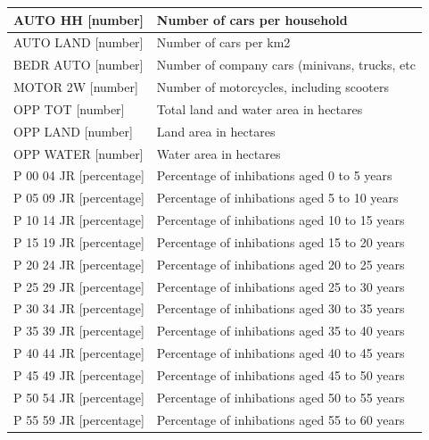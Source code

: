 \documentclass[a4paper,twoside,11pt]{article}
\begin{document}
\begin{center}
\begin{tabular}{ | p{4.9cm} | p{10cm} |}
        AUTO HH [number] & Number of cars per household \\ \hline
        AUTO LAND [number] & Number of cars per km2 \\ \hline
        BEDR AUTO [number] & Number of company cars (minivans, trucks, etc \\ \hline
        MOTOR 2W [number] & Number of motorcycles, including scooters \\ \hline
        OPP TOT [number] & Total land and water area in hectares \\ \hline
        OPP LAND [number] & Land area in hectares \\ \hline
        OPP WATER [number] & Water area in hectares \\ \hline
        P 00 04 JR [percentage] & Percentage of inhibations aged 0 to 5 years \\ \hline
        P 05 09 JR [percentage] & Percentage of inhibations aged 5 to 10 years \\ \hline
        P 10 14 JR [percentage] & Percentage of inhibations aged 10 to 15 years \\ \hline
        P 15 19 JR [percentage] & Percentage of inhibations aged 15 to 20 years \\ \hline
        P 20 24 JR [percentage] & Percentage of inhibations aged 20 to 25 years \\ \hline
        P 25 29 JR [percentage] & Percentage of inhibations aged 25 to 30 years \\ \hline
        P 30 34 JR [percentage] & Percentage of inhibations aged 30 to 35 years \\ \hline
        P 35 39 JR [percentage] & Percentage of inhibations aged 35 to 40 years \\ \hline
        P 40 44 JR [percentage] & Percentage of inhibations aged 40 to 45 years \\ \hline
        P 45 49 JR [percentage] & Percentage of inhibations aged 45 to 50 years \\ \hline
        P 50 54 JR [percentage] & Percentage of inhibations aged 50 to 55 years \\ \hline
        P 55 59 JR [percentage] & Percentage of inhibations aged 55 to 60 years \\ \hline
    \end{tabular}
\end{center}
\end{document}

